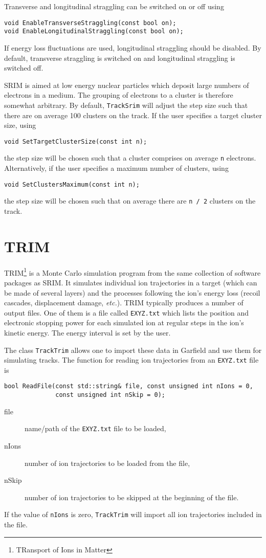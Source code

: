 Transverse and longitudinal straggling can be switched on or off using
\begin{lstlisting}
void EnableTransverseStraggling(const bool on);
void EnableLongitudinalStraggling(const bool on);
\end{lstlisting}
If energy loss fluctuations are used, longitudinal straggling should be disabled.
By default, transverse straggling is switched on and longitudinal straggling 
is switched off. 

SRIM is aimed at low energy nuclear particles which deposit large numbers of electrons in a medium. 
The grouping of electrons to a cluster is therefore somewhat arbitrary. 
By default, \texttt{TrackSrim} will adjust the step size such that 
there are on average 100 clusters on the track.
If the user specifies a target cluster size, using
\begin{lstlisting}
void SetTargetClusterSize(const int n);
\end{lstlisting}
the step size will be chosen such that a cluster comprises on average 
\texttt{n} electrons. Alternatively, if the user specifies a maximum 
number of clusters, using
\begin{lstlisting}
void SetClustersMaximum(const int n);
\end{lstlisting}
the step size will be chosen such that on average there are 
\texttt{n / 2} clusters on the track.

\section{TRIM}
TRIM\footnote{TRansport of Ions in Matter} is a Monte Carlo simulation program 
from the same collection of software packages as SRIM. 
It simulates individual ion trajectories in a target 
(which can be made of several layers) and the processes following the ion's energy loss 
(recoil cascades, displacement damage, \textit{etc.}). 
TRIM typically produces a number of output files. 
One of them is a file called \texttt{EXYZ.txt} which lists the 
position and electronic stopping power for each simulated ion at 
regular steps in the ion's kinetic energy.
The energy interval is set by the user.

The class \texttt{TrackTrim} allows one to import these data in Garfield 
and use them for simulating tracks. The function for 
reading ion trajectories from an \texttt{EXYZ.txt} file is 
\begin{lstlisting}
bool ReadFile(const std::string& file, const unsigned int nIons = 0,
              const unsigned int nSkip = 0);
\end{lstlisting}
\begin{description}
  \item[file] name/path of the \texttt{EXYZ.txt} file to be loaded,
  \item[nIons] number of ion trajectories to be loaded from the file,
  \item[nSkip] number of ion trajectories to be skipped at the beginning of the file.
\end{description}
If the value of \texttt{nIons} is zero, \texttt{TrackTrim} will 
import all ion trajectories included in the file.

